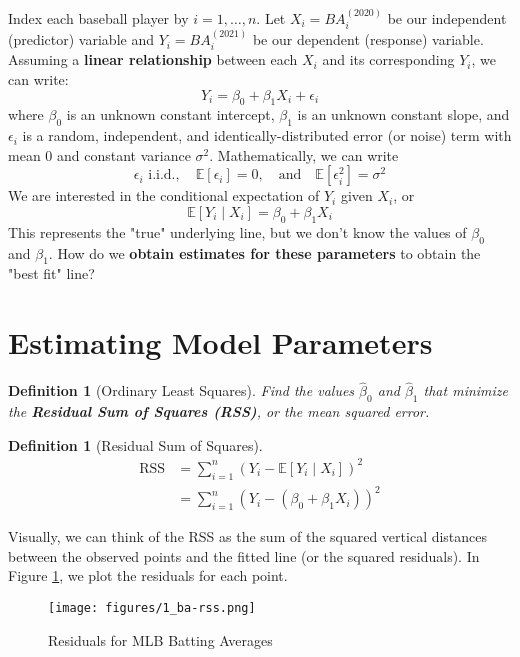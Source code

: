 \documentclass[twoside]{article}
\newtheorem{definition}[theorem]{Definition}
\theoremstyle{definition}
\begin{document}
Index each baseball player by $i = 1, \ldots, n$. Let $X_i = BA_{i}^{(2020)}$ be our independent (predictor) variable and $Y_i = BA_{i}^{(2021)}$ be our dependent (response) variable. Assuming a \textbf{linear relationship} between each $X_i$ and its corresponding $Y_i$, we can write:
\begin{equation}
    Y_i = \beta_0 + \beta_1 X_i + \epsilon_i
\end{equation}
where $\beta_0$ is an unknown constant intercept, $\beta_1$ is an unknown constant slope, and $\epsilon_i$ is a random, independent, and identically-distributed error (or noise) term with mean $0$ and constant variance $\sigma^2$. Mathematically, we can write
\begin{equation}
    \epsilon_i \text{ i.i.d.}, \quad \mathbb{E}[\epsilon_i] = 0, \quad \text{and} \quad \mathbb{E}[\epsilon_i^2] = \sigma^2
\end{equation}
We are interested in the conditional expectation of $Y_i$ given $X_i$, or
\begin{equation}
    \mathbb{E}[Y_i \mid X_i] = \beta_0 + \beta_1 X_i
\end{equation}
This represents the "true" underlying line, but we don't know the values of $\beta_0$ and $\beta_1$. How do we \textbf{obtain estimates for these parameters} to obtain the "best fit" line?

\section{Estimating Model Parameters}

\begin{definition}[Ordinary Least Squares]
Find the values $\widehat{\beta}_0$ and $\widehat{\beta}_1$ that minimize the \textbf{Residual Sum of Squares (RSS)}, or the mean squared error.
\end{definition}
\begin{definition}[Residual Sum of Squares]
\begin{align}
    \text{RSS} &= \sum_{i=1}^n (Y_i - \mathbb{E}[Y_i \mid X_i])^2 \nonumber \\
    &= \sum_{i=1}^n (Y_i - (\beta_0 + \beta_1 X_i))^2
\end{align}
\end{definition}
Visually, we can think of the RSS as the sum of the squared vertical distances between the observed points and the fitted line (or the squared residuals). In Figure \ref{fig:ba-rss}, we plot the residuals for each point. 
\begin{figure}[h]
    \centering
    \texttt{[image: figures/1\_ba-rss.png]}
    \caption{Residuals for MLB Batting Averages}
    \label{fig:ba-rss}
\end{figure}
\end{document}
